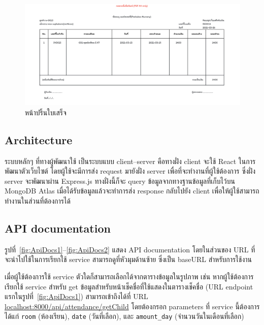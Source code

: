 \begin{itemize}
    \begin{figure}
      \begin{center}
      \includegraphics[width=\linewidth]{images/slipPage.png}
      \end{center}
      \caption[หน้าปริ้นใบเสร็จ]{หน้าปริ้นใบเสร็จ}
      \label{fig:slipPage}
      \end{figure}
\end{itemize}

\subsection{Architecture}

ระบบหลักๆ ที่ทางผู้พัฒนาใช้ เป็นระบบแบบ client--server คือทางฝั่ง client จะใช้ React ในการพัฒนาตัวเว็บไซต์ โดยผู้ใช้จะมีการส่ง request มายังฝั่ง server เพื่อที่จะทำงานที่ผู้ใช้ต้องการ ซึ่งฝั่ง server 
จะพัฒนาผ่าน Express.js ทางฝั่งนี้ก็จะ query ข้อมูลจากทางฐานข้อมูลที่เก็บไว้บน MongoDB Atlas เมื่อได้รับข้อมูลแล้วจะทำการส่ง response กลับไปยัง client เพื่อให้ผู้ใช้สามารถทำงานในส่วนที่ต้องการได้

\subsection{API documentation}
รูปที่~\ref{fig:ApiDocs1}--\ref{fig:ApiDocs2} แสดง API documentation โดยในส่วนของ URL ที่จะนำไปใช้ในการเรียกใช้ service สามารถดูที่หัวมุมด้านซ้าย ซึ่งเป็น baseURL สำหรับการใช้งาน

เมื่อผู้ใช้ต้องการใช้ service ตัวใดก็สามารถเลือกได้จากตารางข้อมูลในรูปภาพ เช่น หากผู้ใช้ต้องการเรียกใช้ service สำหรับ get ข้อมูลสำหรับหน้าเช็คชื่อที่ใช้แสดงในตารางเช็คชื่อ (URL endpoint แรกในรูปที่~\ref{fig:ApiDocs1}) สามารถเข้าถึงได้ที่ URL \url{localhost:8000/api/attendance/getChild} โดยต้องกรอก parameters ที่ service นี้ต้องการ ได้แก่ \texttt{room} (ห้องเรียน), \texttt{date} (วันที่เลือก), และ \texttt{amount\_day} (จำนวนวันในเดือนที่เลือก)

